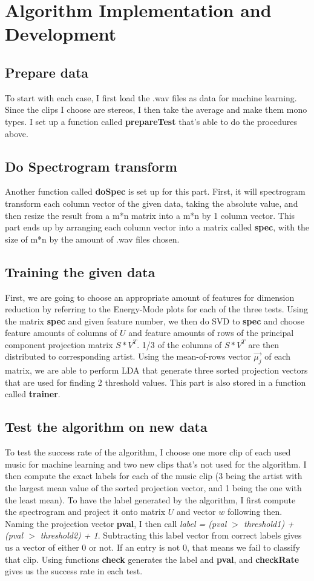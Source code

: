 \documentclass[10pt]{article}
\begin{document}
\section{Algorithm Implementation and Development}
\subsection*{Prepare data}
To start with each case, I first load the .wav files as data for machine learning. Since the clips I choose are stereos, I then take the average and make them mono types. I set up a function called \textbf{prepareTest} that's able to do the procedures above.

\subsection*{Do Spectrogram transform}
Another function called \textbf{doSpec} is set up for this part. First, it will spectrogram transform each column vector of the given data, taking the absolute value, and then resize the result from a m*n matrix into a m*n by 1 column vector. This part ends up by arranging each column vector into a matrix called \textbf{spec}, with the size of m*n by the amount of .wav files chosen.


\subsection*{Training the given data}
First, we are going to choose an appropriate amount of features for dimension reduction by referring to the Energy-Mode plots for each of the three tests. Using the matrix \textbf{spec} and given feature number, we then do SVD to \textbf{spec} and choose feature amounts of columns of $U$ and feature amounts of rows of the principal component projection matrix $S*V^T$. 1/3 of the columns of $S*V^T$ are then distributed to corresponding artist. Using the mean-of-rows vector $\vec{\mu_j}$ of each matrix, we are able to perform LDA that generate three sorted projection vectors that are used for finding 2 threshold values. This part is also stored in a function called \textbf{trainer}.

\subsection*{Test the algorithm on new data}
To test the success rate of the algorithm, I choose one more clip of each used music for machine learning and two new clips that's not used for the algorithm. I then compute the exact labels for each of the music clip (3 being the artist with the largest mean value of the sorted projection vector, and 1 being the one with the least mean). To have the label generated by the algorithm, I first compute the spectrogram and project it onto matrix $U$ and vector $w$ following then. Naming the projection vector \textbf{pval}, I then call \textit{label = (pval $>$ threshold1) + (pval $>$ threshold2) + 1}. Subtracting this label vector from correct labels gives us a vector of either 0 or not. If an entry is not 0, that means we fail to classify that clip. Using functions \textbf{check} generates the label and \textbf{pval}, and \textbf{checkRate} gives us the success rate in each test.
\end{document}
